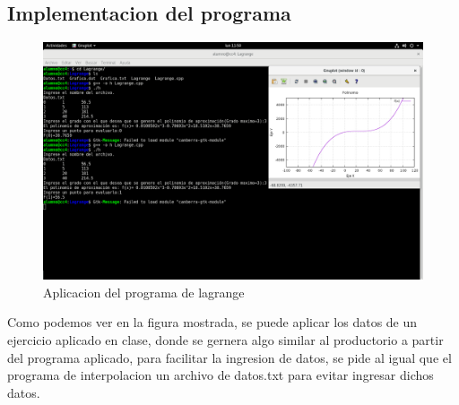\documentclass{article}
\begin{document}
\begin{multicols}{2}
\section{Implementacion del programa}
\label{sec:Imp}
\begin{figure}[H]
\centering
\includegraphics[scale=.125]{Lagrange.png}
\caption{Aplicacion del programa de lagrange}
\end{figure}
Como podemos ver en la figura mostrada, se puede aplicar los datos de un ejercicio aplicado en clase, donde se gernera algo similar al productorio a partir del programa aplicado, para facilitar la ingresion de datos, se pide al igual que el programa de interpolacion un archivo de datos.txt para evitar ingresar dichos datos.


\end{multicols}
\end{document}
